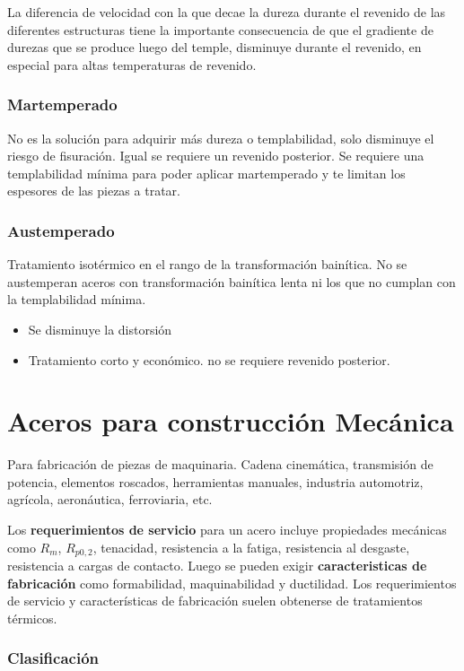 \documentclass{article}
\begin{document}
La diferencia de velocidad
con la que decae la dureza
durante el revenido de las
diferentes estructuras tiene la
importante consecuencia de
que el gradiente de durezas
que se produce luego del
temple, disminuye durante
el revenido, en especial para
altas temperaturas de
revenido.

\section{Martemperado}

No es la solución para adquirir más dureza o templabilidad, solo disminuye el riesgo de fisuración. Igual se requiere un revenido posterior. Se requiere una templabilidad mínima para poder aplicar martemperado y te limitan los espesores de las piezas a tratar.

\section{Austemperado}

Tratamiento isotérmico en el rango de la transformación bainítica. No se austemperan aceros con transformación bainítica lenta ni los que no cumplan con la templabilidad mínima.
\begin{itemize}
    \item Se disminuye la distorsión
    \item Tratamiento corto y económico. no se requiere revenido posterior.
\end{itemize}


\part{Aceros para construcción Mecánica}
Para fabricación de piezas de maquinaria. Cadena cinemática, transmisión de potencia, elementos roscados, herramientas manuales, industria automotriz, agrícola, aeronáutica, ferroviaria, etc.

Los \textbf{requerimientos de servicio} para un acero incluye propiedades mecánicas como $R_m$, $R_{p0,2}$, tenacidad, resistencia a la fatiga, resistencia al desgaste, resistencia a cargas de contacto. Luego se pueden exigir \textbf{caracteristicas de fabricación} como formabilidad, maquinabilidad y ductilidad. Los requerimientos de servicio y características de fabricación suelen obtenerse de tratamientos térmicos.

\section{Clasificación}
\end{document}
